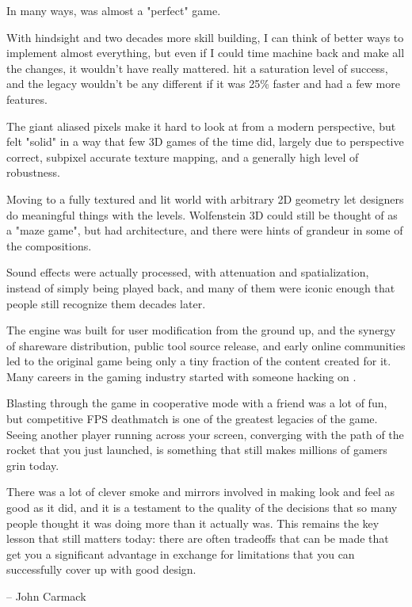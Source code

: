 In many ways, \doom{} was almost a "perfect" game.\\
\par
With hindsight and two decades more skill building, I can think of better ways to implement almost everything, but even if I could time machine back and make all the changes, it wouldn't have really mattered.  \doom{} hit a saturation level of success, and the legacy wouldn't be any different if it was 25\% faster and had a few more features.\\
\par
 The giant aliased pixels make it hard to look at from a modern perspective, but \doom{} felt "solid" in a way that few 3D games of the time did, largely due to perspective correct, subpixel accurate texture mapping, and a generally high level of robustness.\\
\par
Moving to a fully textured and lit world with arbitrary 2D geometry let designers do meaningful things with the levels.  Wolfenstein 3D could still be thought of as a "maze game", but \doom{} had architecture, and there were hints of grandeur in some of the compositions.\\
\par
 Sound effects were actually processed, with attenuation and spatialization, instead of simply being played back, and many of them were iconic enough that people still recognize them decades later.\\
\par
 The engine was built for user modification from the ground up, and the synergy of shareware distribution, public tool source release, and early online communities led to the original game being only a tiny fraction of the content created for it.  Many careers in the gaming industry started with someone hacking on \doom{}.\\
\par
 Blasting through the game in cooperative mode with a friend was a lot of fun, but competitive FPS deathmatch is one of the greatest legacies of the game.  Seeing another player running across your screen, converging with the path of the rocket that you just launched, is something that still makes millions of gamers grin today.\\
\par
 There was a lot of clever smoke and mirrors involved in making \doom{} look and feel as good as it did, and it is a testament to the quality of the decisions that so many people thought it was doing more than it actually was.  This remains the key lesson that still matters today: there are often tradeoffs that can be made that get you a significant advantage in exchange for limitations that you can successfully cover up with good design.\\
\par
-- John Carmack\\
\par
\thispagestyle{plain} %